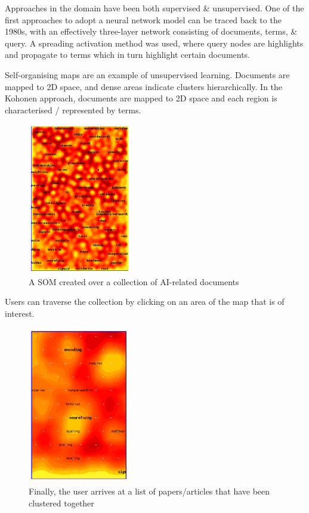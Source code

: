 \documentclass[a4paper,11pt]{article}
\begin{document}
Approaches in the domain have been both supervised \& unsupervised.
One of the first approaches to adopt a neural network model can be traced back to the 1980s, with an effectively three-layer network consisting of documents, terms, \& query.
A spreading activation method was used, where query nodes are highlights and propagate to terms which in turn highlight certain documents.


\begin{tcolorbox}[breakable, colback=gray!10, colframe=black, title=\textbf{Case Study: Self-Organising Maps (Kohonen)}]
Self-organising maps are an example of unsupervised learning.
Documents are mapped to 2D space, and dense areas indicate clusters hierarchically.
In the Kohonen approach, documents are mapped to 2D space and each region is characterised / represented by terms.

\begin{figure}[H]
    \centering
    \includegraphics[width=0.4\textwidth]{./images/som.png}
    \caption{A SOM created over a collection of AI-related documents}
\end{figure}

Users can traverse the collection by clicking on an area of the map that is of interest.

\begin{figure}[H]
    \centering
    \includegraphics[width=0.4\textwidth]{./images/som1.png}
    \caption{Finally, the user arrives at a list of papers/articles that have been clustered together}
\end{figure}


\end{tcolorbox}
\end{document}
